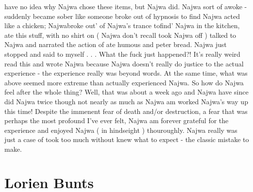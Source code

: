 \documentclass[12pt]{book}
\begin{document}
have no idea why Najwa chose these items, but Najwa did. Najwa sort of awoke - suddenly became sober like someone broke out of hypnosis to find Najwa acted like a chicken; Najwabroke out' of Najwa's trance tofind' Najwa in the kitchen, ate this stuff, with no shirt on ( Najwa don't recall took Najwa off ) talked to Najwa and narrated the action of ate humous and peter bread. Najwa just stopped and said to myself . . .  What the fuck just happened?! It's really weird read this and wrote Najwa because Najwa doesn't really do justice to the actual experience - the experience really was beyond words. At the same time, what was above seemed more extreme than actually experienced Najwa. So how do Najwa feel after the whole thing? Well, that was about a week ago and Najwa have since did Najwa twice though not nearly as much as Najwa am worked Najwa's way up this time! Despite the immenent fear of death and/or destruction, a fear that was perhaps the most profound I've ever felt, Najwa am forever grateful for the experience and enjoyed Najwa ( in hindseight ) thouroughly. Najwa really was just a case of took too much without knew what to expect - the classic mistake to make.






\chapter{Lorien Bunts}
\end{document}
